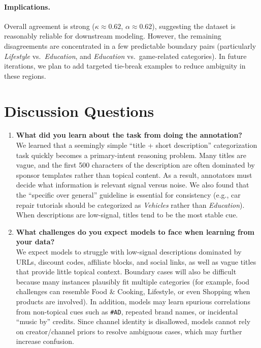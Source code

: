 \documentclass[11pt]{article}
\begin{document}
\paragraph{Implications.}
Overall agreement is strong ($\kappa \approx 0.62$, $\alpha \approx 0.62$), suggesting the dataset is reasonably reliable
for downstream modeling. However, the remaining disagreements are concentrated in a few predictable boundary pairs
(particularly \emph{Lifestyle} vs.\ \emph{Education}, and \emph{Education} vs.\ game-related categories). In future
iterations, we plan to add targeted tie-break examples to
reduce ambiguity in these regions.

\section{Discussion Questions}
\begin{enumerate}
  \item \textbf{What did you learn about the task from doing the annotation?}\\
  We learned that a seemingly simple ``title + short description'' categorization task quickly becomes a primary-intent reasoning problem. Many titles are vague, and the first 500 characters of the description are often dominated by sponsor templates rather than topical content. As a result, annotators must decide what information is relevant signal versus noise. We also found that the ``specific over general'' guideline is essential for consistency (e.g., car repair tutorials should be categorized as \emph{Vehicles} rather than \emph{Education}). When descriptions are low-signal, titles tend to be the most stable cue.

  \item \textbf{What challenges do you expect models to face when learning from your data?}\\
  We expect models to struggle with low-signal descriptions dominated by URLs, discount codes, affiliate blocks, and social links, as well as vague titles that provide little topical context. Boundary cases will also be difficult because many instances plausibly fit multiple categories (for example, food challenges can resemble Food \& Cooking, Lifestyle, or even Shopping when products are involved). In addition, models may learn spurious correlations from non-topical cues such as \texttt{\#AD}, repeated brand names, or incidental ``music by'' credits. Since channel identity is disallowed, models cannot rely on creator/channel priors to resolve ambiguous cases, which may further increase confusion.


\end{enumerate}
\end{document}
